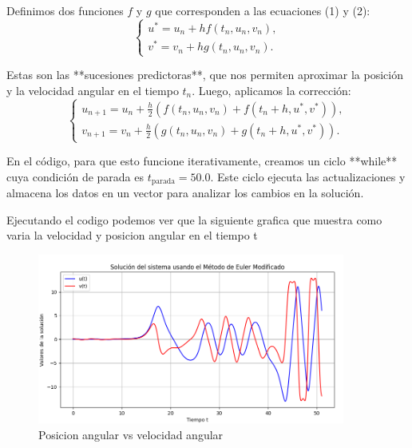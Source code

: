 \documentclass{article}
\begin{document}
Definimos dos funciones $f$ y $g$ que corresponden a las ecuaciones (1) y (2):
\begin{equation}
    \begin{cases}
        u^* = u_n + h f(t_n, u_n, v_n),  \\
        v^* = v_n + h g(t_n, u_n, v_n).
    \end{cases}
\end{equation}

Estas son las **sucesiones predictoras**, que nos permiten aproximar la posición y la velocidad angular en el tiempo $t_n$. Luego, aplicamos la corrección:
\begin{equation}
    \begin{cases}
        u_{n+1} = u_n + \frac{h}{2} \left( f(t_n, u_n, v_n) + f(t_n + h, u^*, v^*) \right),  \\
        v_{n+1} = v_n + \frac{h}{2} \left( g(t_n, u_n, v_n) + g(t_n + h, u^*, v^*) \right).
    \end{cases}
\end{equation}

En el código, para que esto funcione iterativamente, creamos un ciclo **while** cuya condición de parada es $t_{\text{parada}} = 50.0$. Este ciclo ejecuta las actualizaciones y almacena los datos en un vector para analizar los cambios en la solución.

Ejecutando el codigo podemos ver que la siguiente grafica que muestra como varia la velocidad y posicion angular en el tiempo t

\begin{figure}[h]
    \centering
    \includegraphics[width=0.9\textwidth]{Captura.PNG}
    \caption{Posicion angular vs velocidad angular}
    \label{fig:etiqueta}
\end{figure}
\end{document}
